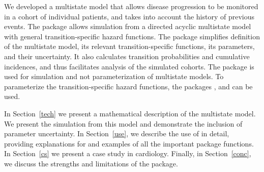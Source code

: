 We developed a multistate model that allows disease progression to be monitored in a cohort of individual patients, and takes into account the history of previous events. The  package  allows simulation from a directed acyclic multistate model with general transition-specific hazard functions. The package simplifies definition of the multistate model, its relevant transition-specific functions, its parameters, and their uncertainty. It also calculates transition probabilities and cumulative incidences, and thus facilitates analysis of the simulated cohorts.
The  package  is used for simulation and not parameterization of multistate models. To parameterize the transition-specific hazard functions, the  packages  \citep{pkg:survival},  \citep{pkg:mstate} and  \citep{pkg:muhaz} can be used. 


In Section~\ref{tech} we present a mathematical description of the multistate model. We present the simulation from this model and demonstrate the inclusion of parameter uncertainty. In Section~\ref{use}, we describe the use of  in detail, providing explanations for and examples of all the important package functions. In Section~\ref{cs} we present a case study in cardiology.  Finally, in Section~\ref{conc}, we discuss the strengths and limitations of the package.

